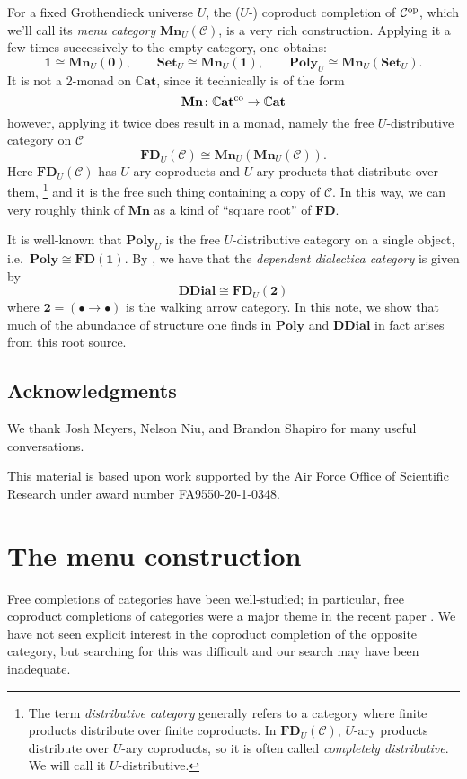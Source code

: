 \documentclass[11pt, one side, article]{memoir}
\theoremstyle{definition}
\theoremstyle{plain}
\newcommand{\cat}[1]{\mathcal{#1}}%
\newcommand{\Cat}[1]{\mathbf{#1}}%
\newcommand{\op}{^\tn{op}}
\newcommand{\co}{^\tn{co}}
\newcommand{\tn}[1]{\textnormal{#1}}
\newcommand{\smset}{\Cat{Set}}
\newcommand{\smcat}{\mathbb{C}\Cat{at}}
\newcommand{\poly}{\Cat{Poly}}
\newcommand{\0}{\Cat{0}}
\newcommand{\1}{\Cat{1}}
\newcommand{\fd}{\Cat{FD}}
\newcommand{\mn}{\Cat{Mn}}
\newcommand{\ddial}{\Cat{DDial}}
\begin{document}
For a fixed Grothendieck universe $U$, the ($U$-) coproduct completion of $\cat{C}\op$, which we'll call its \emph{menu category} $\mn_U(\cat{C})$, is a very rich construction. Applying it a few times successively to the empty category, one obtains:
\[
	\1\cong \mn_U(\0),\qquad
	\smset_U\cong\mn_U(\1),\qquad
	\poly_U\cong\mn_U(\smset_U).
\]
It is not a 2-monad on $\smcat$, since it technically is of the form
\[
\mn\colon\smcat\co\to\smcat
\]
however, applying it twice does result in a monad, namely the free $U$-distributive category on $\cat{C}$
\[
\fd_U(\cat{C})\cong\mn_U(\mn_U(\cat{C})).
\]
Here $\fd_U(\cat{C})$ has $U$-ary coproducts and $U$-ary products that distribute over them,%
\footnote{The term \emph{distributive category} generally refers to a category where finite products distribute over finite coproducts. In $\fd_U(\cat{C})$, $U$-ary products distribute over $U$-ary coproducts, so it is often called \emph{completely distributive}. We will call it $U$-distributive.}
 and it is the free such thing containing a copy of $\cat{C}$. In this way, we can very roughly think of $\mn$ as a kind of ``square root'' of $\fd$. 

It is well-known that $\poly_U$ is the free $U$-distributive category on a single object, i.e.\ $\poly\cong\fd(\1)$. By \cite{moss2018dialectica}, we have that the \emph{dependent dialectica category} is given by 
\[\ddial\cong\fd_U(\Cat{2})\]
where $\Cat{2}=(\bullet\to\bullet)$ is the walking arrow category. In this note, we show that much of the abundance of structure one finds in $\poly$ and $\ddial$ in fact arises from this root source.

\section*{Acknowledgments}
We thank Josh Meyers, Nelson Niu, and Brandon Shapiro for many useful conversations.  

This material is based upon work supported by the Air Force Office of Scientific Research under award number FA9550-20-1-0348.


\chapter{The menu construction}

Free completions of categories have been well-studied; in particular, free coproduct completions of categories were a major theme in the recent paper \cite{adamek2020nice}. We have not seen explicit interest in the coproduct completion of the opposite category, but searching for this was difficult and our search may have been inadequate.
\end{document}
